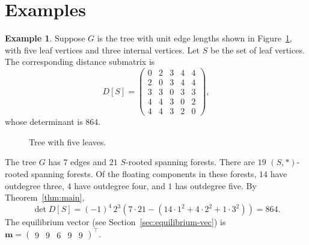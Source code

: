 \documentclass[12pt]{amsart}
\theoremstyle{definition}
\newtheorem{eg}[thm]{Example}
\newcommand{\boldm}{\mathbf{m}}
\newcommand{\tr}{\intercal}
\begin{document}
\section{Examples}
\label{sec:examples}

\begin{eg}
Suppose $G$ is the tree with unit edge lengths shown in Figure~\ref{fig:tree-5}, with five leaf vertices and three internal vertices.
Let $S$ be the set of leaf vertices. 
The corresponding distance submatrix is
\[
	D[S] = \begin{pmatrix}
	0 & 2 & 3 & 4 & 4 \\
	2 & 0 & 3 & 4 & 4 \\
	3 & 3 & 0 & 3 & 3 \\
	4 & 4 & 3 & 0 & 2 \\
	4 & 4 & 3 & 2 & 0
	\end{pmatrix},
\]
whose determinant is $864$.

\begin{figure}[h]
\centering
{}
\caption{Tree with five leaves.}
\label{fig:tree-5}
\end{figure}

The tree $G$ has $7$ edges and $21$ $S$-rooted spanning forests.
There are $19$ $(S, *)$-rooted spanning forests. 
Of the floating components in these forests, $14$ have outdegree three, $4$ have outdegree four, and $1$ has outdegree five.
By Theorem~\ref{thm:main},
\[
	\det D[S] 
	= (-1)^4\, 2^3 \left( 7 \cdot 21 - (14 \cdot 1^2 + 4 \cdot 2^2 + 1 \cdot 3^2) \right) = 864.
\]
The equilibrium vector (see Section~\ref{sec:equilibrium-vec}) is 
$
	\boldm = \begin{pmatrix} 9 & 9 & 6 & 9 & 9 \end{pmatrix}^\tr .
$
\end{eg}
\end{document}
